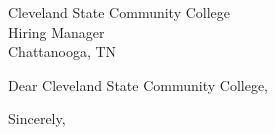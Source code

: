 \documentclass[10pt,letter]{letter}
\def\hm{Cleveland State Community College} %
\begin{document}
\begin{letter}{\hm \\ Hiring Manager \\ Chattanooga, TN }

\opening{Dear \hm,}

\setlength\parindent{.5in}



 

\closing{Sincerely,}
\end{letter}
\end{document}
